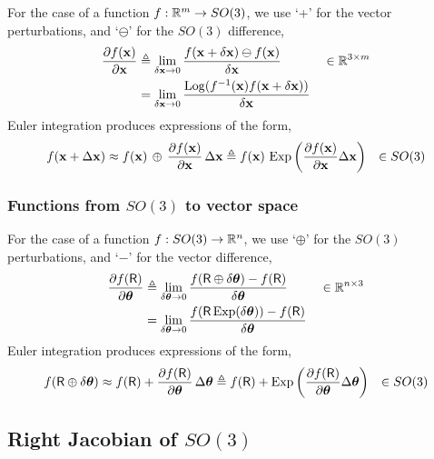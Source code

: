 For the case of a function $f:{\mathbb R}^m\to SO(3)$, we use `+' for the vector perturbations, and `$\ominus$' for the $SO(3)$ difference,
%
\begin{align}
\frac{\partial f({\bf x})}{\partial{\bf x}} &\triangleq \lim_{\delta{\bf x}\to0} \frac{ f({\bf x}+\delta{\bf x})\ominus f({\bf x})}{\delta{\bf x}} && \in {\mathbb R}^{3\times m} \label{equ:dif_RtoSO3}\\
&= \lim_{\delta{\bf x}\to0} \frac{\operatorname*{Log}(f^{-1}({\bf x}) f({\bf x}+\delta{\bf x}))}{\delta{\bf x}}
\end{align}
%
Euler integration produces expressions of the form,
%
\begin{align*}
f({\bf x}+\Delta{\bf x}) &\approx f({\bf x})\,\oplus\,\frac{\partial f({\bf x})}{\partial{\bf x}}\,\Delta{\bf x}
 \triangleq f({\bf x})\,\operatorname*{Exp}\left(\frac{\partial f({\bf x})}{\partial{\bf x}}\Delta{\bf x}\right)
 & \in SO(3)
\end{align*}

\subsubsection{Functions from $SO(3)$ to vector space}

For the case of a function $f: SO(3)\to{\mathbb R}^n$, we use `$\oplus$' for the $SO(3)$ perturbations, and `$-$' for the vector difference,
%
\begin{align}
\frac{\partial f(\mathsf R)}{\partial{{\bm \theta}}} &\triangleq \lim_{\delta{{\bm \theta}}\to0} \frac{f(\mathsf R\oplus\delta{{\bm \theta}}) - f(\mathsf R)}{\delta{{\bm \theta}}} && \in {\mathbb R}^{n\times 3} \label{equ:jacobian_SO3_Rn}\\
&= \lim_{\delta{{\bm \theta}}\to0} \frac{f(\mathsf R\operatorname*{Exp}(\delta{{\bm \theta}})) - f(\mathsf R)}{\delta{{\bm \theta}}}
\end{align}
%
Euler integration produces expressions of the form,
%
\begin{align*}
f(\mathsf R\oplus\delta{{\bm \theta}}) &\approx f(\mathsf R)+\frac{\partial f(\mathsf R)}{\partial{{\bm \theta}}}\,\Delta{{\bm \theta}}
 \triangleq f(\mathsf R)+\operatorname*{Exp}\left(\frac{\partial f(\mathsf R)}{\partial{{\bm \theta}}}\Delta{{\bm \theta}}\right)
 & \in SO(3)
\end{align*}


\subsection{Right Jacobian of $SO(3)$ }

